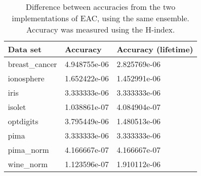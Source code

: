 \begin{table}[h]
\centering
\caption{Difference between accuracies from the two implementations of EAC, using the same ensemble. Accuracy was measured using the H-index.}

\begin{tabular}{lll}
\toprule
Data set &      Accuracy & Accuracy (lifetime) \\
\midrule
breast\_cancer &  4.948755e-06 &      2.825769e-06 \\
ionosphere    &  1.652422e-06 &      1.452991e-06 \\
iris          &  3.333333e-06 &      3.333333e-06 \\
isolet        &  1.038861e-07 &      4.084904e-07 \\
optdigits     &  3.795449e-06 &      1.480513e-06 \\
pima          &  3.333333e-06 &      3.333333e-06 \\
pima\_norm     &  4.166667e-07 &      4.166667e-07 \\
wine\_norm     &  1.123596e-07 &      1.910112e-06 \\
\bottomrule
\end{tabular}

\label{tab:validation error acc}
\end{table}






